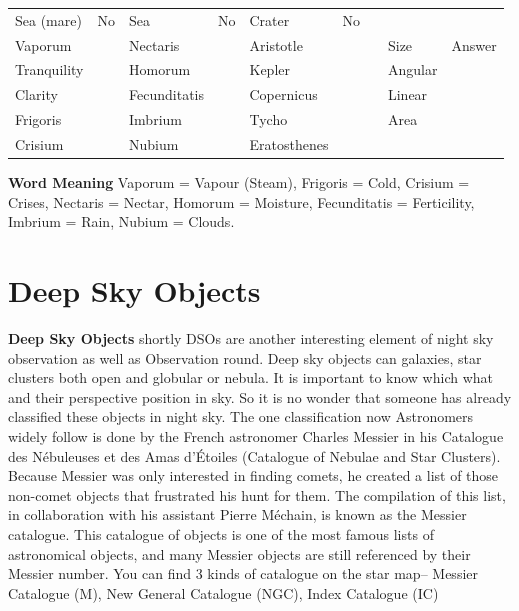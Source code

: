 \documentclass[a4paper,12pt]{extarticle}
\begin{document}
\begin{table}[H]
	\centering
	\begin{tabular}{|l|l|l|l|l|l|lll}
		\cline{1-6}
		Sea (mare)        & No\quad & Sea       & No\quad & Crater       & No &                       &                              &                            \\ \cline{1-6} \cline{8-9} 
		Vaporum      &    & Nectaris    &    & Aristotle    &    & \multicolumn{1}{l|}{} & \multicolumn{1}{l|}{Size}    & \multicolumn{1}{l|}{Answer} \\ \cline{1-6} \cline{8-9} 
		Tranquility &    & Homorum  &    & Kepler       &    & \multicolumn{1}{l|}{} & \multicolumn{1}{l|}{Angular} & \multicolumn{1}{l|}{}      \\ \cline{1-6} \cline{8-9} 
		Clarity     &    & Fecunditatis &    & Copernicus   &    & \multicolumn{1}{l|}{} & \multicolumn{1}{l|}{Linear}  & \multicolumn{1}{l|}{}      \\ \cline{1-6} \cline{8-9} 
		Frigoris        &    & Imbrium    &    & Tycho        &    & \multicolumn{1}{l|}{} & \multicolumn{1}{l|}{Area}    & \multicolumn{1}{l|}{}      \\ \cline{1-6} \cline{8-9} 
		Crisium      &    & Nubium    &    & Eratosthenes &    &                       &                              &                            \\ \cline{1-6}
	\end{tabular}
\end{table}

\textbf{Word Meaning} Vaporum = Vapour (Steam), Frigoris = Cold, Crisium = Crises, Nectaris = Nectar, Homorum = Moisture, Fecunditatis = Ferticility, Imbrium = Rain, Nubium = Clouds. 



\clearpage 
\section{Deep Sky Objects}

\textbf{Deep Sky Objects} shortly DSOs are another interesting element of night sky observation as well as Observation round. Deep sky objects can galaxies, star clusters both open and globular or nebula. It is important to know which what and their perspective position in sky. So it is no wonder that someone has already classified these objects in night sky. The one classification now Astronomers widely follow is done by the French astronomer Charles Messier in his Catalogue des Nébuleuses et des Amas d'Étoiles (Catalogue of Nebulae and Star Clusters). Because Messier was only interested in finding comets, he created a list of those non-comet objects that frustrated his hunt for them. The compilation of this list, in collaboration with his assistant Pierre Méchain, is known as the Messier catalogue. This catalogue of objects is one of the most famous lists of astronomical objects, and many Messier objects are still referenced by their Messier number. You can find 3 kinds of catalogue  on the star map-- Messier Catalogue (M), New General Catalogue (NGC), Index Catalogue (IC)\\
\end{document}

